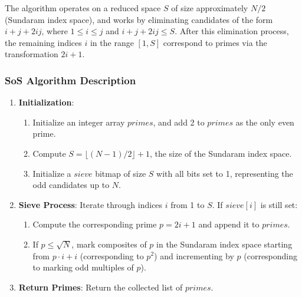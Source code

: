 \documentclass{article}
\begin{document}
The algorithm operates on a reduced space $S$ of size approximately $N/2$ (Sundaram index space), and works by eliminating candidates of the form $i + j + 2ij$, where $1 \le i \le j$ and $i + j + 2ij \le S$. After this elimination process, the remaining indices $i$ in the range $[1, S]$ correspond to primes via the transformation $2i + 1$.

\subsubsection*{SoS Algorithm Description}
\begin{enumerate}[noitemsep]
    \item \textbf{Initialization}: 
    \begin{enumerate}
        \item Initialize an integer array $primes$, and add 2 to $primes$ as the only even prime.
        \item Compute $S = \lfloor (N-1)/2 \rfloor + 1$, the size of the Sundaram index space.
        \item Initialize a $sieve$ bitmap of size $S$ with all bits set to 1, representing the odd candidates up to $N$.
    \end{enumerate}
    \item \textbf{Sieve Process}: Iterate through indices $i$ from 1 to $S$. If $sieve[i]$ is still set:
    \begin{enumerate}
        \item Compute the corresponding prime $p = 2i + 1$ and append it to $primes$.
        \item If $p \le \sqrt{N}$, mark composites of $p$ in the Sundaram index space starting from $p \cdot i + i$ (corresponding to $p^2$) and incrementing by $p$ (corresponding to marking odd multiples of $p$).
    \end{enumerate}
    \item \textbf{Return Primes}: Return the collected list of $primes$.
\end{enumerate}
\end{document}
